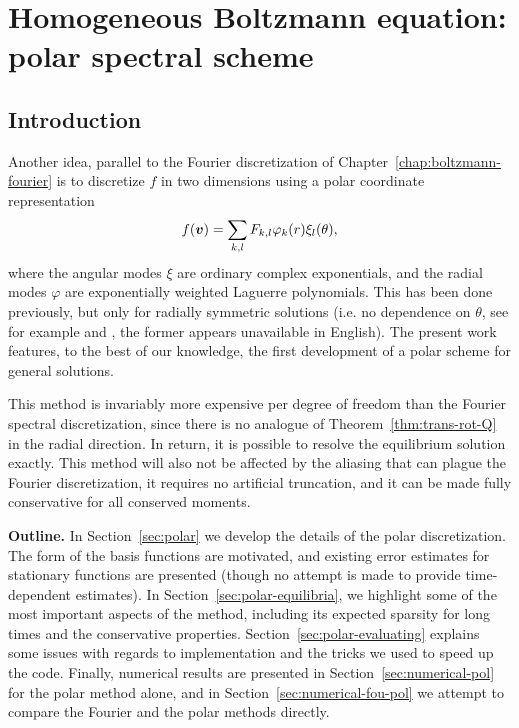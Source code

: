 \chapter{Homogeneous Boltzmann equation: polar spectral scheme}
\label{chap:boltzmann-polar}

\section{Introduction} 
\label{sect:polar-intro}

Another idea, parallel to the Fourier discretization of Chapter~\ref{chap:boltzmann-fourier} is to discretize
$f$ in two dimensions using a polar coordinate representation
\[
    f({\bm v}) = \sum_{k,l} F_{k,l} \varphi_k(r) \xi_l(\theta),
\]
where the angular modes $\xi$ are ordinary complex exponentials, and the radial modes $\varphi$ are
exponentially weighted Laguerre polynomials. This has been done previously, but only for radially symmetric
solutions (i.e. no dependence on $\theta$, see for example \cite{Ender1994mmi} and \cite{Ender1999pei}, the former
appears unavailable in English). The present work features, to the best of our knowledge, the first
development of a polar scheme for general solutions.

This method is invariably more expensive per degree of freedom than the Fourier spectral discretization, since
there is no analogue of Theorem~\ref{thm:trans-rot-Q} in the radial direction. In return, it is possible to
resolve the equilibrium solution exactly. This method will also not be affected by the aliasing that can
plague the Fourier discretization, it requires no artificial truncation, and it can be made fully conservative
for all conserved moments.

\textbf{Outline.} In Section~\ref{sec:polar} we develop the details of the polar discretization. The form of
the basis functions are motivated, and existing error estimates for stationary functions are presented (though
no attempt is made to provide time-dependent estimates). In Section~\ref{sec:polar-equilibria}, we highlight
some of the most important aspects of the method, including its expected sparsity for long times and the
conservative properties. Section~\ref{sec:polar-evaluating} explains some issues with regards to
implementation and the tricks we used to speed up the code. Finally, numerical results are presented in
Section~\ref{sec:numerical-pol} for the polar method alone, and in Section~\ref{sec:numerical-fou-pol} we
attempt to compare the Fourier and the polar methods directly.

